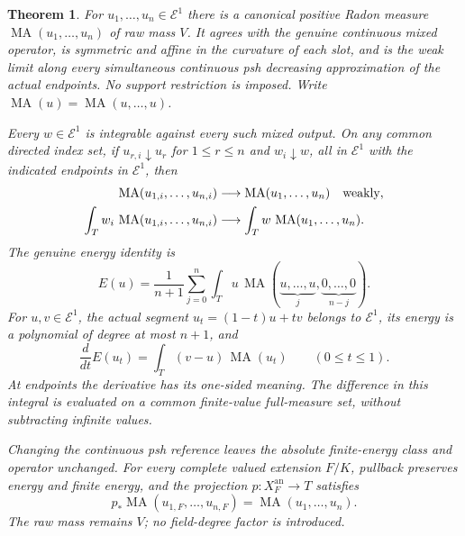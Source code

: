 \documentclass[11pt]{article}
\newtheorem{theorem}{Theorem}
\newcommand{\MA}{\operatorname{MA}}
\newcommand{\an}{\mathrm{an}}
\newcommand{\E}{\mathcal E}
\begin{document}
\begin{theorem}\label{thm:main}
For $u_1,\ldots,u_n\in\E^1$ there is a canonical positive Radon
measure $\MA(u_1,\ldots,u_n)$ of raw mass $V$. It agrees with the
genuine continuous mixed operator, is symmetric and affine in the
curvature of each slot, and is the weak limit along every simultaneous
continuous psh decreasing approximation of the actual endpoints.
No support restriction is imposed. Write $\MA(u)=\MA(u,\ldots,u)$.

Every $w\in\E^1$ is integrable against every such mixed output. On
any common directed index set, if $u_{r,i}\downarrow u_r$ for
$1\leq r\leq n$ and $w_i\downarrow w$, all in $\E^1$ with the
indicated endpoints in $\E^1$, then
\begin{equation}\label{eq:weighted}
 \begin{split}
 \MA(u_{1,i},\ldots,u_{n,i})&\longrightarrow
                   \MA(u_1,\ldots,u_n)\quad\hbox{weakly},\\
 \int_T w_i\,\MA(u_{1,i},\ldots,u_{n,i})&\longrightarrow
                   \int_T w\,\MA(u_1,\ldots,u_n).
 \end{split}
\end{equation}
The genuine energy identity is
\begin{equation}\label{eq:sing-energy}
 E(u)=\frac1{n+1}\sum_{j=0}^n
        \int_Tu\,\MA(\underbrace{u,\ldots,u}_{j},
                       \underbrace{0,\ldots,0}_{n-j}).
\end{equation}
For $u,v\in\E^1$, the actual segment $u_t=(1-t)u+tv$ belongs to
$\E^1$, its energy is a polynomial of degree at most $n+1$, and
\begin{equation}\label{eq:derivative}
 \frac{d}{dt}E(u_t)=\int_T(v-u)\,\MA(u_t)
                      \qquad(0\leq t\leq1).
\end{equation}
At endpoints the derivative has its one-sided meaning. The difference
in this integral is evaluated on a common finite-value full-measure
set, without subtracting infinite values.

Changing the continuous psh reference leaves the absolute finite-energy
class and operator unchanged. For every complete valued extension
$F/K$, pullback preserves energy and finite energy, and the projection
$p:X_F^{\an}\to T$ satisfies
\begin{equation}\label{eq:basechange}
 p_*\MA(u_{1,F},\ldots,u_{n,F})=\MA(u_1,\ldots,u_n).
\end{equation}
The raw mass remains $V$; no field-degree factor is introduced.
\end{theorem}
\end{document}
